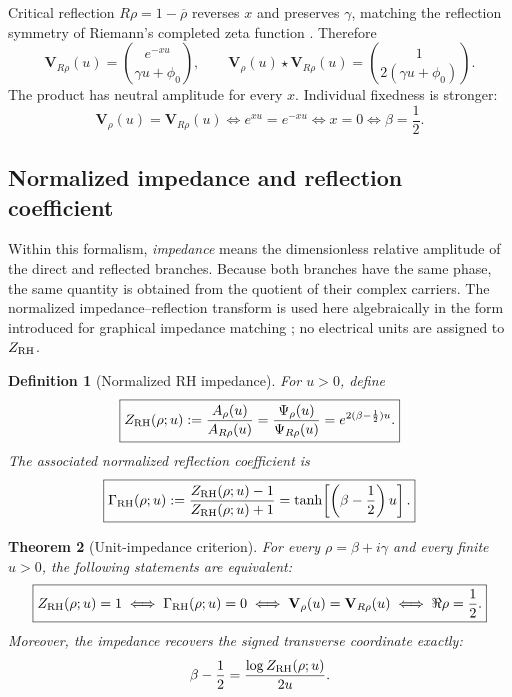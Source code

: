 \documentclass[11pt]{article}
\newtheorem{definition}{Definition}[section]
\newtheorem{theorem}[definition]{Theorem}
\begin{document}
Critical reflection $R\rho=1-\overline\rho$ reverses $x$ and preserves $\gamma$, matching the
reflection symmetry of Riemann's completed zeta function \cite{DLMFreflection}.  Therefore
\begin{equation}\label{eq:reflected-state}
 \mathbf V_{R\rho}(u)=\binom{e^{-xu}}{\gamma u+\phi_0},
 \qquad
 \mathbf V_\rho(u)\star\mathbf V_{R\rho}(u)
 =\binom{1}{2(\gamma u+\phi_0)}.
\end{equation}
The product has neutral amplitude for every $x$.  Individual fixedness is stronger:
\begin{equation}\label{eq:state-fixedness}
 \mathbf V_\rho(u)=\mathbf V_{R\rho}(u)
 \iff e^{xu}=e^{-xu}
 \iff x=0
 \iff \beta=\frac12.
\end{equation}

\subsection{Normalized impedance and reflection coefficient}
Within this formalism, \emph{impedance} means the dimensionless relative amplitude of the
direct and reflected branches.  Because both branches have the same phase, the same quantity
is obtained from the quotient of their complex carriers.  The normalized impedance--reflection
transform is used here algebraically in the form introduced for graphical impedance matching
\cite{Smith1939}; no electrical units are assigned to $Z_{\rm RH}$.

\begin{definition}[Normalized RH impedance]\label{def:RH-impedance}
For $u>0$, define
\begin{equation}\label{eq:RH-impedance}
 \boxed{
 Z_{\rm RH}(\rho;u)
 :=\frac{A_\rho(u)}{A_{R\rho}(u)}
 =\frac{\Psi_\rho(u)}{\Psi_{R\rho}(u)}
 =e^{2(\beta-\frac12)u}.}
\end{equation}
The associated normalized reflection coefficient is
\begin{equation}\label{eq:RH-reflection-coefficient}
 \boxed{
 \Gamma_{\rm RH}(\rho;u)
 :=\frac{Z_{\rm RH}(\rho;u)-1}{Z_{\rm RH}(\rho;u)+1}
 =\tanh\!\left[\left(\beta-\frac12\right)u\right].}
\end{equation}
\end{definition}

\begin{theorem}[Unit-impedance criterion]\label{thm:unit-impedance}
For every $\rho=\beta+i\gamma$ and every finite $u>0$, the following statements are
equivalent:
\begin{equation}\label{eq:unit-impedance-equivalence}
 \boxed{
 Z_{\rm RH}(\rho;u)=1
 \iff \Gamma_{\rm RH}(\rho;u)=0
 \iff \mathbf V_\rho(u)=\mathbf V_{R\rho}(u)
 \iff \Re\rho=\frac12.}
\end{equation}
Moreover, the impedance recovers the signed transverse coordinate exactly:
\begin{equation}\label{eq:impedance-inverse}
 \beta-\frac12=\frac{\log Z_{\rm RH}(\rho;u)}{2u}.
\end{equation}
\end{theorem}
\end{document}
